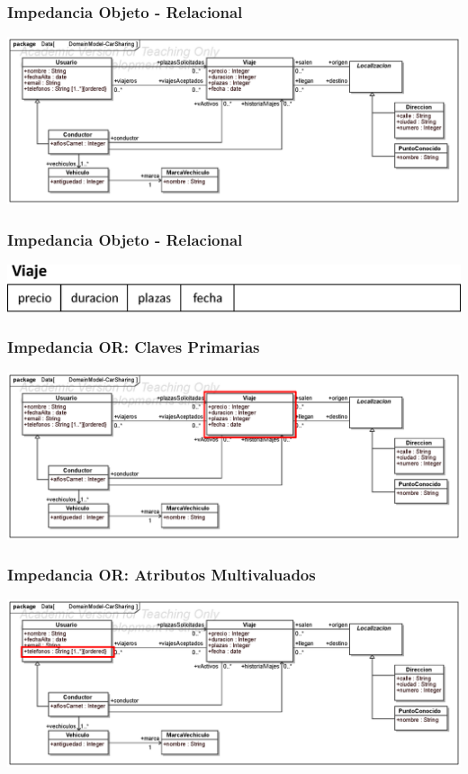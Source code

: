 \documentclass[a4paper,slidestop,xcolor=pst,dvips,blue]{beamer}
\begin{document}
\begin{frame}[c]
    \frametitle{Impedancia Objeto - Relacional}
    \begin{center}
        \includegraphics[width=\linewidth]{images/persistencia/ooMismatch/ooMismatch00.eps}
    \end{center}
\end{frame}

\begin{frame}[c]
    \frametitle{Impedancia Objeto - Relacional}
    \begin{center}
        \includegraphics[width=0.8\linewidth]{images/persistencia/ooMismatch/ooMismatch01.eps}
    \end{center}
\end{frame}

\begin{frame}[c]
    \frametitle{Impedancia OR: Claves Primarias}
    \begin{center}
        \includegraphics[width=\linewidth]{images/persistencia/ooMismatch/ooMismatch09.eps}
    \end{center}
\end{frame}

\begin{frame}[c]
    \frametitle{Impedancia OR: Atributos Multivaluados}
    \begin{center}
        \includegraphics[width=\linewidth]{images/persistencia/ooMismatch/ooMismatch02.eps}
    \end{center}
\end{frame}
\end{document}
